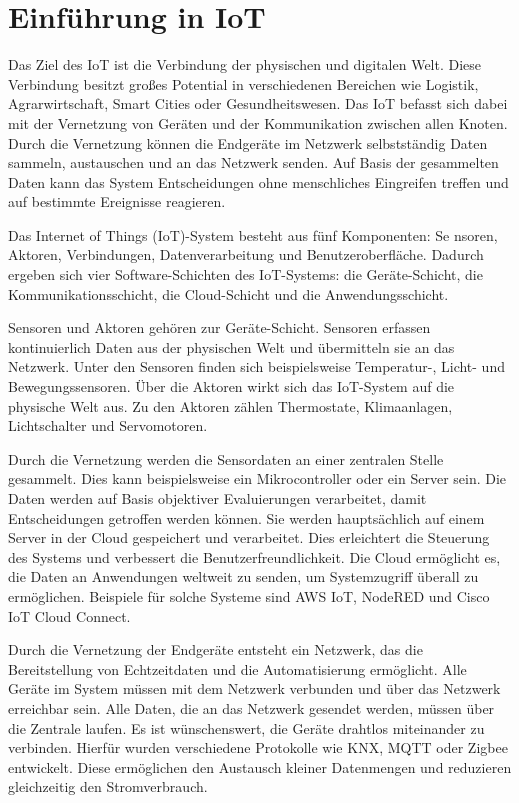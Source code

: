 \documentclass[12pt, a4paper]{article}
\author{Oleksii Baida}
\date{Novemver 2023}
\begin{document}
%

\tableofcontents
\pagebreak

\section{Einführung in IoT}
\par Das Ziel des IoT ist die Verbindung der physischen und digitalen Welt. Diese Verbindung besitzt großes Potential in verschiedenen Bereichen wie Logistik, Agrarwirtschaft, Smart Cities oder Gesundheitswesen. Das IoT befasst sich dabei mit der Vernetzung von Geräten und der Kommunikation zwischen allen Knoten. Durch die Vernetzung können die Endgeräte im Netzwerk selbstständig Daten sammeln, austauschen und an das Netzwerk senden. Auf Basis der gesammelten Daten kann das System Entscheidungen ohne menschliches Eingreifen treffen und auf bestimmte Ereignisse reagieren. 
\par Das Internet of Things (IoT)-System besteht aus fünf Komponenten: Se nsoren, Aktoren, Verbindungen, Datenverarbeitung und Benutzeroberfläche. Dadurch ergeben sich vier Software-Schichten des IoT-Systems: die Geräte-Schicht, die Kommunikationsschicht, die Cloud-Schicht und die Anwendungsschicht.
\par Sensoren und Aktoren gehören zur Geräte-Schicht. Sensoren erfassen kontinuierlich Daten aus der physischen Welt und übermitteln sie an das Netzwerk. Unter den Sensoren finden sich beispielsweise Temperatur-, Licht- und Bewegungssensoren. Über die Aktoren wirkt sich das IoT-System auf die physische Welt aus. Zu den Aktoren zählen Thermostate, Klimaanlagen, Lichtschalter und Servomotoren. 
\par Durch die Vernetzung werden die Sensordaten an einer zentralen Stelle gesammelt. Dies kann beispielsweise ein Mikrocontroller oder ein Server sein. Die Daten werden auf Basis objektiver Evaluierungen verarbeitet, damit Entscheidungen getroffen werden können. Sie werden hauptsächlich auf einem Server in der Cloud gespeichert und verarbeitet. Dies erleichtert die Steuerung des Systems und verbessert die Benutzerfreundlichkeit. Die Cloud ermöglicht es, die Daten an Anwendungen weltweit zu senden, um Systemzugriff überall zu ermöglichen. Beispiele für solche Systeme sind AWS IoT, NodeRED und Cisco IoT Cloud Connect.
\par Durch die Vernetzung der Endgeräte entsteht ein Netzwerk, das die Bereitstellung von Echtzeitdaten und die Automatisierung ermöglicht. Alle Geräte im System müssen mit dem Netzwerk verbunden und über das Netzwerk erreichbar sein. Alle Daten, die an das Netzwerk gesendet werden, müssen über die Zentrale laufen. Es ist wünschenswert, die Geräte drahtlos miteinander zu verbinden. Hierfür wurden verschiedene Protokolle wie KNX, MQTT oder Zigbee entwickelt. Diese ermöglichen den Austausch kleiner Datenmengen und reduzieren gleichzeitig den Stromverbrauch.
\end{document}
